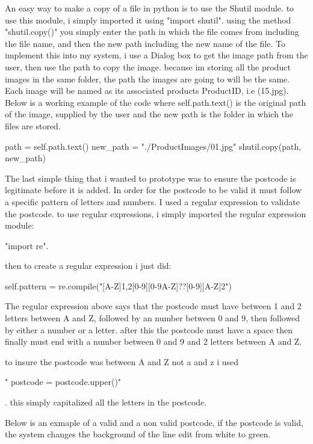 \begin{python}
An easy way to make a copy of a file in python is to use the Shutil module. to use this module, i simply imported it using "import shutil". using the method "shutil.copy()" you simply enter the path in which the file comes from including the file name, and then the new path including the new name of the file. To implement this into my system, i use a Dialog box to get the image path from the user, then use the path to copy the image. because im storing all the product images in the same folder, the path the images are going to will be the same. Each image will be named as its associated products ProductID, i.e (15.jpg). Below is a working example of the code where self.path.text() is the original path of the image, supplied by the user and the new path is the folder in which the files are stored.

\begin{python}
path = self.path.text()
new_path = "./ProductImages/01.jpg"
shutil.copy(path, new_path)
\end{python}

The last simple thing that i wanted to prototype was to ensure the postcode is legitimate before it is added. In order for the postcode to be valid it must follow a specific pattern of letters and numbers. I used a regular expression to validate the postcode. to use regular expressions, i simply imported the regular expression module: \begin{python}"import re".\end{python} then to create a regular expression i just did:
\begin{python}
self.pattern = re.compile("[A-Z]{1,2}[0-9][0-9A-Z]?\s?[0-9][A-Z]{2}")
\end{python}
 The regular expression above says that the postcode must have between 1 and 2 letters between A and Z, followed by an number between 0 and 9, then followed by either a number or a letter. after this the postcode must have a space then finally must end with a number between 0 and 9 and 2 letters between A and Z.

to insure the postcode was between A and Z not a and z i used \begin{python}" postcode = postcode.upper()" \end{python}. this simply capitalized all the letters in the postcode.

Below is an exmaple of a valid and a non valid postcode, if the postcode is valid, the system changes the background of the line edit from white to green.


\end{python}
